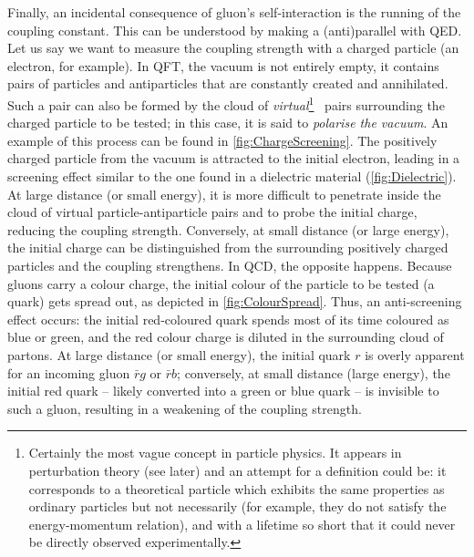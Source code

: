 Finally, an incidental consequence of gluon's self-interaction is the running of the coupling constant. This can be understood by making a (anti)parallel with QED. Let us say we want to measure the coupling strength with a charged particle (an electron, for example). In QFT, the vacuum is not entirely empty, it contains pairs of particles and antiparticles that are constantly created and annihilated. Such a pair can also be formed by the cloud of \textit{virtual}\footnote{Certainly the most vague concept in particle physics. It appears in perturbation theory (see later) and an attempt for a definition could be: it corresponds to a theoretical particle which exhibits the same properties as ordinary particles but not necessarily (for example, they do not satisfy the energy-momentum relation), and with a lifetime so short that it could never be directly observed experimentally.} \EplusEminus\ pairs surrounding the charged particle to be tested; in this case, it is said to \textit{polarise the vacuum}. An example of this process can be found in \fig\ref{fig:ChargeScreening}. The positively charged particle from the vacuum is attracted to the initial electron, leading in a screening effect similar to the one found in a dielectric material (\fig\ref{fig:Dielectric}). At large distance (or small energy), it is more difficult to penetrate inside the cloud of virtual particle-antiparticle pairs and to probe the initial charge, reducing the coupling strength. Conversely, at small distance (or large energy), the initial charge can be distinguished from the surrounding positively charged particles and the coupling strengthens. In QCD, the opposite happens.  Because gluons carry a colour charge, the initial colour of the particle to be tested (a quark) gets spread out, as depicted in \fig\ref{fig:ColourSpread}. Thus, an anti-screening effect occurs: the initial red-coloured quark spends most of its time coloured as blue or green, and the red colour charge is diluted in the surrounding cloud of partons. At large distance (or small energy), the initial quark $r$ is overly apparent for an incoming gluon $\bar{r}g$ or $\bar{r}b$; conversely, at small distance (large energy), the initial red quark -- likely converted into a green or blue quark -- is invisible to such a gluon, resulting in a weakening of the coupling strength. \\

